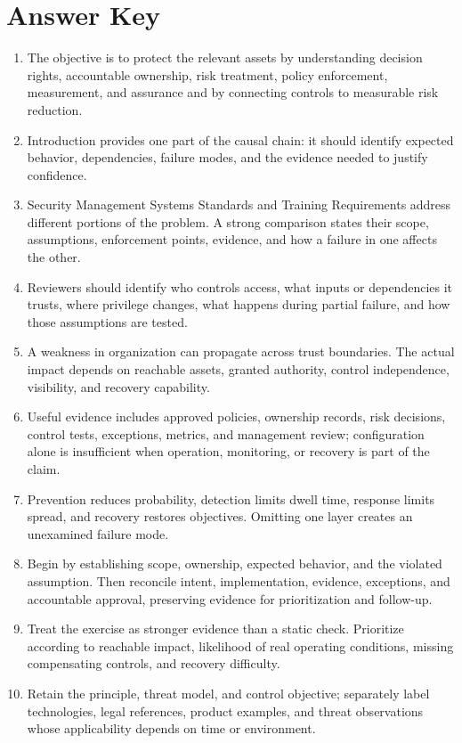 \documentclass[11pt]{article}
\begin{document}
\section*{Answer Key}
\begin{enumerate}
\item The objective is to protect the relevant assets by understanding decision rights, accountable ownership, risk treatment, policy enforcement, measurement, and assurance and by connecting controls to measurable risk reduction.
\item Introduction provides one part of the causal chain: it should identify expected behavior, dependencies, failure modes, and the evidence needed to justify confidence.
\item Security Management Systems Standards and Training Requirements address different portions of the problem. A strong comparison states their scope, assumptions, enforcement points, evidence, and how a failure in one affects the other.
\item Reviewers should identify who controls access, what inputs or dependencies it trusts, where privilege changes, what happens during partial failure, and how those assumptions are tested.
\item A weakness in organization can propagate across trust boundaries. The actual impact depends on reachable assets, granted authority, control independence, visibility, and recovery capability.
\item Useful evidence includes approved policies, ownership records, risk decisions, control tests, exceptions, metrics, and management review; configuration alone is insufficient when operation, monitoring, or recovery is part of the claim.
\item Prevention reduces probability, detection limits dwell time, response limits spread, and recovery restores objectives. Omitting one layer creates an unexamined failure mode.
\item Begin by establishing scope, ownership, expected behavior, and the violated assumption. Then reconcile intent, implementation, evidence, exceptions, and accountable approval, preserving evidence for prioritization and follow-up.
\item Treat the exercise as stronger evidence than a static check. Prioritize according to reachable impact, likelihood of real operating conditions, missing compensating controls, and recovery difficulty.
\item Retain the principle, threat model, and control objective; separately label technologies, legal references, product examples, and threat observations whose applicability depends on time or environment.
\end{enumerate}
\end{document}
